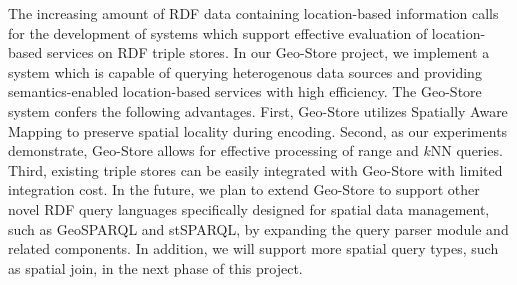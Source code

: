 
The increasing amount of RDF data containing location-based
information calls for the development of systems which support
effective evaluation of location-based services on RDF triple
stores. In our Geo-Store project, we implement a system which is
capable of querying heterogenous data sources and providing
semantics-enabled location-based services with high efficiency.
The Geo-Store system confers the following advantages. First,
Geo-Store utilizes Spatially Aware Mapping to preserve spatial
locality during encoding. Second, as our experiments demonstrate,
Geo-Store allows for effective processing of range and $k$NN
queries. Third, existing triple stores can be easily integrated
with Geo-Store with limited integration cost. In the future, we
plan to extend Geo-Store to support other novel RDF query
languages specifically designed for spatial data management, such
as GeoSPARQL and stSPARQL, by expanding the query parser module
and related components. In addition, we will support more spatial
query types, such as spatial join, in the next phase of this
project.


